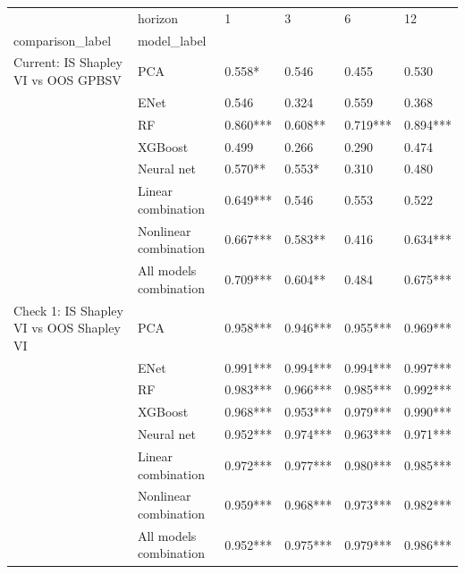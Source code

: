 \begin{tabular}{llllll}
\toprule
                                     & horizon &        1  &        3  &        6  &        12 \\
comparison\_label & model\_label &           &           &           &           \\
\midrule
Current: IS Shapley VI vs OOS GPBSV & PCA &    0.558* &     0.546 &     0.455 &     0.530 \\
                                     & ENet &     0.546 &     0.324 &     0.559 &     0.368 \\
                                     & RF &  0.860*** &   0.608** &  0.719*** &  0.894*** \\
                                     & XGBoost &     0.499 &     0.266 &     0.290 &     0.474 \\
                                     & Neural net &   0.570** &    0.553* &     0.310 &     0.480 \\
                                     & Linear combination &  0.649*** &     0.546 &     0.553 &     0.522 \\
                                     & Nonlinear combination &  0.667*** &   0.583** &     0.416 &  0.634*** \\
                                     & All models combination &  0.709*** &   0.604** &     0.484 &  0.675*** \\
Check 1: IS Shapley VI vs OOS Shapley VI & PCA &  0.958*** &  0.946*** &  0.955*** &  0.969*** \\
                                     & ENet &  0.991*** &  0.994*** &  0.994*** &  0.997*** \\
                                     & RF &  0.983*** &  0.966*** &  0.985*** &  0.992*** \\
                                     & XGBoost &  0.968*** &  0.953*** &  0.979*** &  0.990*** \\
                                     & Neural net &  0.952*** &  0.974*** &  0.963*** &  0.971*** \\
                                     & Linear combination &  0.972*** &  0.977*** &  0.980*** &  0.985*** \\
                                     & Nonlinear combination &  0.959*** &  0.968*** &  0.973*** &  0.982*** \\
                                     & All models combination &  0.952*** &  0.975*** &  0.979*** &  0.986*** \\

\end{tabular}
